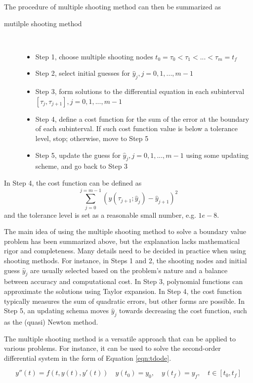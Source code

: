 \documentclass  [
  paper    = a4,
  BCOR     = 10mm,
  twoside,
  fontsize = 12pt,
  fleqn,
  toc      = bibnumbered,
  toc      = listofnumbered,
  numbers  = noendperiod,
  headings = normal,
  listof   = leveldown,
  version  = 3.03
]                                       {scrreprt}
\newcommand{\<}{\langle}
\renewcommand{\>}{\rangle}
\begin{document}
The procedure of multiple shooting method can then be summarized as
\begin{description}
	\item[mutilple shooting method] \
	\begin{itemize}
		\item Step 1, choose multiple shooting nodes $t_0 = \tau_0 < \tau_1 < ... < \tau_m = t_f$ 
		\item Step 2, select initial guesses for $\hat{y}_j, j = 0, 1, ..., m-1$ 
		\item Step 3, form solutions to the differential equation in each subinterval $[\tau_j, \tau_{j+1}], j= 0, 1, ..., m-1$
		\item Step 4, define a cost function for the sum of the error at the boundary of each subinterval. If such cost function value is below a tolerance level, stop; otherwise, move to Step 5
		\item Step 5, update the guess for $\hat{y}_j, j = 0, 1, ..., m-1$ using some updating scheme, and go back to Step 3
	\end{itemize}
\end{description}
In Step 4, the cost function can be defined as 
\begin{equation}
	\sum_{j=0}^{j=m-1}(y(\tau_{j+1}; \hat{y}_j) - \hat{y}_{j+1})^2
\end{equation}
and the tolerance level is set as a reasonable small number, e.g. $1e-8$.

The main idea of using the multiple shooting method to solve a boundary value problem has been summarized above, but the explanation lacks mathematical rigor and completeness. Many details need to be decided in practice when using shooting methods. For instance, in Steps 1 and 2, the shooting nodes and initial guess $\hat{y}_j$ are usually selected based on the problem's nature and a balance between accuracy and computational cost. In Step 3, polynomial functions can approximate the solutions using Taylor expansion. In Step 4, the cost function typically measures the sum of quadratic errors, but other forms are possible. In Step 5, an updating schema moves $\hat{y}_j$ towards decreasing the cost function, such as the (quasi) Newton method.


The multiple shooting method is a versatile approach that can be applied to various problems. For instance, it can be used to solve the second-order differential system in the form of Equation \ref{eqn:tdode}. 




\begin{equation}
	y''(t) = f(t, y(t), y'(t))  \quad y(t_0) = y_0, \quad y(t_f) = y_f,  \quad t \in [t_0, t_f]
	\label{eqn:tdode}
\end{equation}
\end{document}
